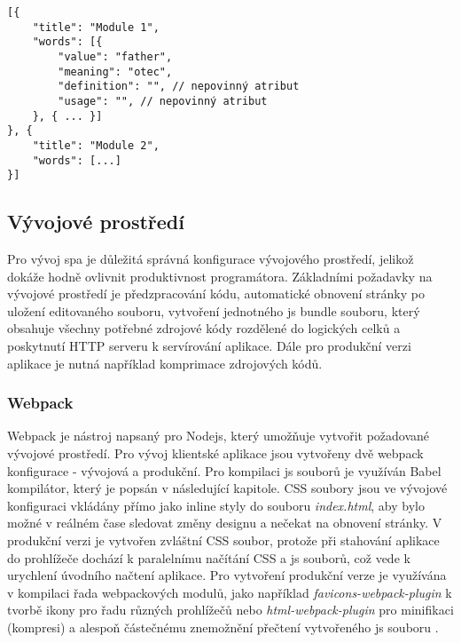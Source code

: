 \documentclass[a4paper,11pt,titlepage,fleqn]{article}
\begin{document}
\begin{minipage}[c]{0.95\textwidth}
\begin{lstlisting}[language=JS, caption={Struktura výstupního souboru z první části importu},label=code:import-json]
[{
    "title": "Module 1",
    "words": [{
        "value": "father",
        "meaning": "otec",
        "definition": "", // nepovinný atribut
        "usage": "", // nepovinný atribut
    }, { ... }]
}, {
    "title": "Module 2",
    "words": [...]
}]
\end{lstlisting}
\end{minipage}

    \subsection{Vývojové prostředí}
        Pro vývoj \gls{spa} je důležitá správná konfigurace vývojového prostředí, jelikož dokáže hodně ovlivnit produktivnost programátora. Základními požadavky na vývojové prostředí je předzpracování kódu, automatické obnovení stránky po uložení editovaného souboru, vytvoření jednotného \gls{js} bundle souboru, který obsahuje všechny potřebné zdrojové kódy rozdělené do logických celků a poskytnutí HTTP serveru k servírování aplikace. Dále pro produkční verzi aplikace je nutná například komprimace zdrojových kódů.

        \subsubsection{Webpack}
            Webpack je nástroj napsaný pro Node\gls{js}, který umožňuje vytvořit požadované vývojové prostředí. Pro vývoj klientské aplikace jsou vytvořeny dvě webpack konfigurace - vývojová a produkční. Pro kompilaci \gls{js} souborů je využíván Babel kompilátor, který je popsán v následující kapitole. CSS soubory jsou ve vývojové konfiguraci vkládány přímo jako inline styly do souboru \textit{index.html}, aby bylo možné v reálném čase sledovat změny designu a nečekat na obnovení stránky. V produkční verzi je vytvořen zvláštní CSS soubor, protože při stahování aplikace do prohlížeče dochází k paralelnímu načítání CSS a \gls{js} souborů, což vede k urychlení úvodního načtení aplikace. Pro vytvoření produkční verze je využívána v kompilaci řada webpackových modulů, jako například \textit{favicons-webpack-plugin} k tvorbě ikony pro řadu různých prohlížečů nebo \textit{html-webpack-plugin} pro minifikaci (kompresi) a alespoň částečnému znemožnění přečtení vytvořeného \gls{js} souboru \cite{bib:webpack}.
\end{document}
